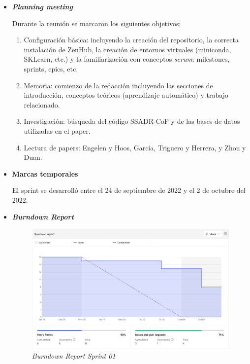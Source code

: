 \begin{itemize}
	\item \textbf{\textit{Planning meeting}}
	
	Durante la reunión se marcaron los siguientes objetivos:
	
	\begin{enumerate}
		\item Configuración básica: incluyendo la creación del repositorio, la correcta instalación de ZenHub, la creación de entornos virtuales (miniconda, SKLearn, etc.) y la familiarización con conceptos \textit{scrum}: milestones, sprints, epics, etc.
		
		\item Memoria: comienzo de la redacción incluyendo las secciones de introducción, conceptos teóricos (aprendizaje automático) y trabajo relacionado.
		
		\item Investigación: búsqueda del código SSADR-CoF y de las bases de datos utilizadas en el paper.
		
		\item Lectura de papers: Engelen y Hoos, García, Triguero y Herrera, y Zhou y Duan.
	\end{enumerate}
	
	\item \textbf{Marcas temporales}
	
	El sprint se desarrolló entre el 24 de septiembre de 2022 y el 2 de octubre del 2022.
	
	\item \textbf{\textit{Burndown Report}}
	
	\begin{figure}[h]
		\caption{\textit{Burndown Report Sprint 01}}
		\centering
		\includegraphics[width=\textwidth]{../img/anexos/s01_bdr}
	\end{figure}
	

\end{itemize}

